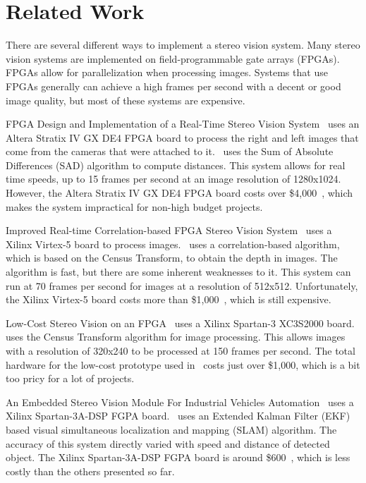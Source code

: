 \chapter{Related Work}

There are several different ways to implement a stereo vision system. Many stereo vision systems are implemented on field-programmable gate arrays (FPGAs). FPGAs allow for parallelization when processing images. Systems that use FPGAs generally can achieve a high frames per second with a decent or good image quality, but most of these systems are expensive. 

FPGA Design and Implementation of a Real-Time Stereo Vision System~\cite{alteraStratixIVPaper} uses an Altera Stratix IV GX DE4 FPGA board to process the right and left images that come from the cameras that were attached to it.~\cite{alteraStratixIVPaper} uses the Sum of Absolute Differences (SAD) algorithm to compute distances. This system allows for real time speeds, up to 15 frames per second at an image resolution of 1280x1024. However, the Altera Stratix IV GX DE4 FPGA board costs over \$4,000~\cite{alteraStratixIVBoard}, which makes the system impractical for non-high budget projects.

Improved Real-time Correlation-based FPGA Stereo Vision System~\cite{xilinxVirtex5Paper} uses a Xilinx Virtex-5 board to process images.~\cite{xilinxVirtex5Paper} uses a correlation-based algorithm, which is based on the Census Transform, to obtain the depth in images. The algorithm is fast, but there are some inherent weaknesses to it. This system can run at 70 frames per second for images at a resolution of 512x512. Unfortunately, the Xilinx Virtex-5 board costs more than \$1,000~\cite{xilinxVirtex5Board}, which is still expensive.

Low-Cost Stereo Vision on an FPGA~\cite{lowCost1000} uses a Xilinx Spartan-3 XC3S2000 board.~\cite{lowCost1000} uses the Census Transform algorithm for image processing. This allows images with a resolution of 320x240 to be processed at 150 frames per second. The total hardware for the low-cost prototype used in~\cite{lowCost1000} costs just over \$1,000, which is a bit too pricy for a lot of projects.

An Embedded Stereo Vision Module For Industrial Vehicles Automation~\cite{xilinxSpartan3APaper} uses a Xilinx Spartan-3A-DSP FGPA board.~\cite{xilinxSpartan3APaper} uses an Extended Kalman Filter (EKF) based visual simultaneous localization and mapping (SLAM) algorithm. The accuracy of this system directly varied with speed and distance of detected object. The Xilinx Spartan-3A-DSP FGPA board is  around \$600~\cite{xilinxSpartan3ABoard}, which is less costly than the others presented so far.

